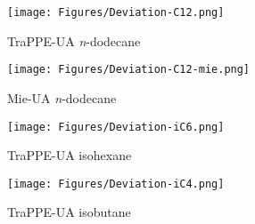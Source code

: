\documentclass[%
 aip,
 jcp,
 sd,%
 amsmath,amssymb,
]{revtex4-1}
\begin{document}
\begin{figure*}
\centering
\texttt{[image: Figures/Deviation-C12.png]}
\caption{
TraPPE-UA \textit{n}-dodecane
}
\label{fig:Deviation-C12}
\end{figure*}

\begin{figure*}
\centering
\texttt{[image: Figures/Deviation-C12-mie.png]}
\caption{
Mie-UA \textit{n}-dodecane
}
\label{fig:Deviation-C12-mie}
\end{figure*}

\begin{figure*}
\centering
\texttt{[image: Figures/Deviation-iC6.png]}
\caption{
TraPPE-UA isohexane
}
\label{fig:Deviation-iC6}
\end{figure*}

\begin{figure*}
\centering
\texttt{[image: Figures/Deviation-iC4.png]}
\caption{
TraPPE-UA isobutane
}
\label{fig:Deviation-iC4}
\end{figure*}






\newpage%
\clearpage

\end{document}
